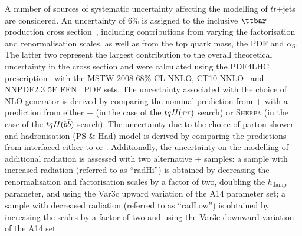 A number of sources of systematic uncertainty affecting the modelling of $t\bar{t}$+jets are considered. 
An uncertainty of  6\% is assigned to the inclusive $\ttbar$ production
cross section~\cite{Czakon:2011xx}, including contributions from varying the factorisation and renormalisation 
scales, as well as from the top quark mass, the PDF and $\alpha_{\textrm{S}}$. The latter two represent the largest contribution 
to the overall theoretical uncertainty in the cross section and were calculated using the PDF4LHC prescription~\cite{Botje:2011sn} 
with the MSTW 2008 68\% CL NNLO, CT10 NNLO~\cite{Lai:2010vv,Gao:2013xoa} and NNPDF2.3 5F FFN~\cite{Ball:2012cx} PDF sets.
The uncertainty associated with the choice of NLO generator is derived by comparing the nominal prediction from
{\powheg}+{\pythiaeight} with a prediction from either {\amcatnlo}+{\pythiaeight} (in the case of the $tqH(\tau\tau)$ search) or
\textsc{Sherpa} (in the case of the $tqH(b\bar{b})$ search). 
The uncertainty due to the choice of parton shower and hadronisation (PS \& Had) model is derived 
by comparing the predictions from {\powheg} interfaced either to {\pythiaeight} or {}. 
Additionally, the uncertainty on the modelling of additional radiation is assessed with two alternative {\powheg}+{\pythiaeight} samples:
a sample with increased radiation (referred to as ``radHi'') is obtained by decreasing the renormalisation and factorisation scales  
by a factor of two, doubling the $h_{\textrm{damp}}$ parameter, and using the Var3c upward variation of the A14 parameter set;
a sample with decreased radiation (referred to as ``radLow'') is obtained by increasing the scales by a factor of two 
and using the Var3c downward variation of the A14 set~\cite{ATL-PHYS-PUB-2016-004}.

